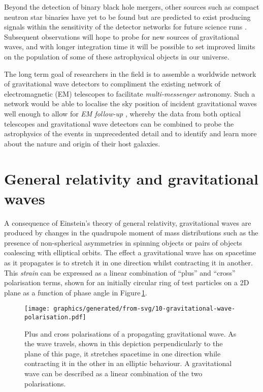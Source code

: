 Beyond the detection of binary black hole mergers, other sources such as compact neutron star binaries have yet to be found but are predicted to exist producing signals within the sensitivity of the detector networks for future science runs \cite{Abbott2016f}. Subsequent observations will hope to probe for new sources of gravitational waves, and with longer integration time it will be possible to set improved limits on the population of some of these astrophysical objects in our universe.

The long term goal of researchers in the field is to assemble a worldwide network of gravitational wave detectors to compliment the existing network of electromagnetic (\gls{EM}) telescopes to facilitate \emph{multi-messenger} astronomy. Such a network would be able to localise the sky position of incident gravitational waves well enough to allow for \emph{\gls{EM} follow-up} \cite{Abbott2016e, Abbott2016f}, whereby the data from both optical telescopes and gravitational wave detectors can be combined to probe the astrophysics of the events in unprecedented detail and to identify and learn more about the nature and origin of their host galaxies.

\section{General relativity and gravitational waves}
A consequence of Einstein's theory of general relativity, gravitational waves are produced by changes in the quadrupole moment of mass distributions such as the presence of non-spherical asymmetries in spinning objects or pairs of objects coalescing with elliptical orbits. The effect a gravitational wave has on spacetime as it propagates is to stretch it in one direction whilst contracting it in another. This \emph{strain} can be expressed as a linear combination of ``plus'' and ``cross'' polarisation terms, shown for an initially circular ring of test particles on a 2D plane as a function of phase angle in Figure\,\ref{fig:gravitational-wave-polarisation}.

\begin{figure}
  \centering
  \texttt{[image: graphics/generated/from-svg/10-gravitational-wave-polarisation.pdf]}
  \caption[Plus and cross polarisations of a propagating gravitational wave]{\label{fig:gravitational-wave-polarisation}Plus and cross polarisations of a propagating gravitational wave. As the wave travels, shown in this depiction perpendicularly to the plane of this page, it stretches spacetime in one direction while contracting it in the other in an elliptic behaviour. A gravitational wave can be described as a linear combination of the two polarisations.}
\end{figure}


